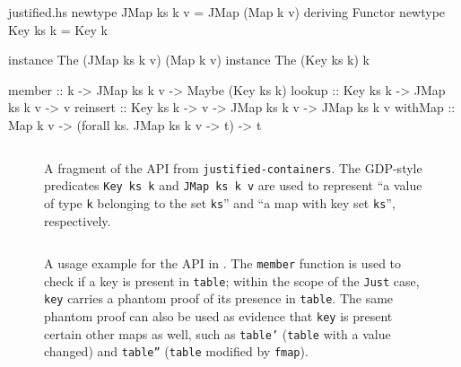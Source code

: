 \documentclass[format=sigplan, review=false, screen=true]{acmart}
\begin{document}
\begin{filecontents*}{justified.hs}
newtype JMap ks k v = JMap (Map k v) deriving Functor
newtype Key  ks k   = Key k

instance The (JMap ks k v) (Map k v)
instance The (Key ks k) k

member   :: k -> JMap ks k v -> Maybe (Key ks k)
lookup   :: Key ks k -> JMap ks k v -> v
reinsert :: Key ks k -> v -> JMap ks k v -> JMap ks k v
withMap  :: Map k v -> (forall ks. JMap ks k v -> t) -> t
\end{filecontents*}


\begin{figure}
  \inputminted{haskell}{justified.hs}
  \caption{A fragment of the API from \texttt{justified-containers}.
    The GDP-style predicates \texttt{Key ks k} and \texttt{JMap ks k v} are used to represent
    ``a value of type \texttt{k} belonging to the set \texttt{ks}'' and ``a map with key set \texttt{ks}'',
    respectively. \label{justified-api}}
\end{figure}
\begin{figure}
  \inputminted{haskell}{justified-usage.hs}
  \caption{A usage example for the API in . The \texttt{member} function is used
    to check if a key is present in \texttt{table}; within the scope of the \texttt{Just} case, \texttt{key}
    carries a phantom proof of its presence in \texttt{table}. The same phantom proof can also be used as evidence that
    \texttt{key} is present certain other maps as well, such as \texttt{table'} (\texttt{table} with a
    value changed) and \texttt{table''} (\texttt{table} modified by \texttt{fmap}).\label{justified-usage}} 
\end{figure}
\end{document}
